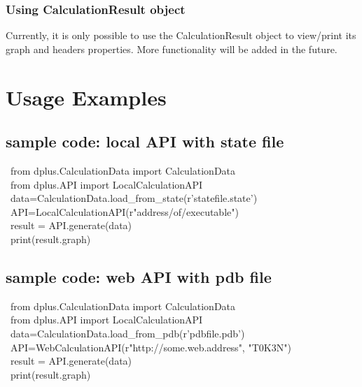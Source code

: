 \documentclass[12pt]{article}
\begin{document}
\subsubsection{Using CalculationResult object}
Currently, it is only possible to use the CalculationResult object to view/print its graph
and headers properties. More functionality will be added in the future.
	
	\section{Usage Examples}
\subsection{sample code: local API with state file}
~from dplus.CalculationData import CalculationData~\\
~from dplus.API import LocalCalculationAPI~\\
~data=CalculationData.load_from_state(r'statefile.state')~\\
~API=LocalCalculationAPI(r"address/of/executable")~\\
~result = API.generate(data)~\\
~print(result.graph)~\\

\subsection{sample code: web API with pdb file}


~from dplus.CalculationData import CalculationData~\\
~from dplus.API import LocalCalculationAPI~\\
~data=CalculationData.load_from_pdb(r'pdbfile.pdb')~\\
~API=WebCalculationAPI(r"http://some.web.address", "T0K3N")~\\
~result = API.generate(data)~\\
~print(result.graph)~\\
	
	
\end{document}
